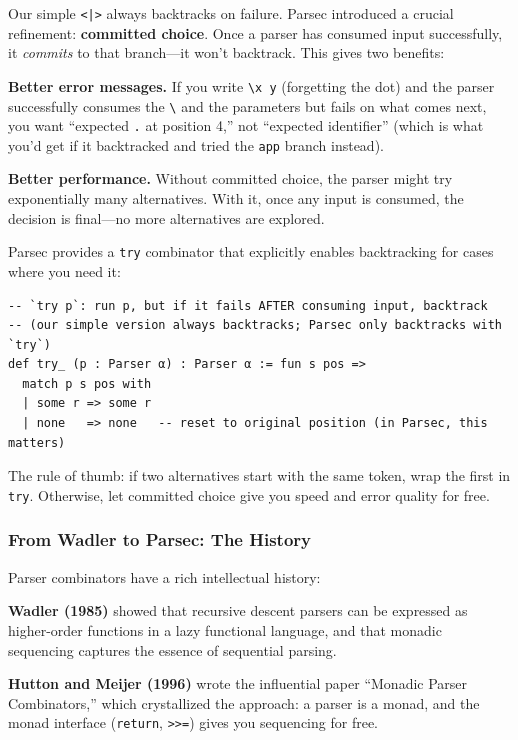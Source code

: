 \documentclass[11pt,a4paper]{article}
\theoremstyle{definition}
\begin{document}
Our simple \texttt{<|>} always backtracks on failure. Parsec introduced a
crucial refinement: \textbf{committed choice}. Once a parser has consumed
input successfully, it \emph{commits} to that branch---it won't backtrack.
This gives two benefits:

\textbf{Better error messages.} If you write \verb|\x y| (forgetting the dot) and the parser
successfully consumes the \verb|\| and the parameters but fails on what comes
next, you want ``expected \texttt{.} at position 4,'' not ``expected
identifier''  (which is what you'd get if it backtracked and tried the
\texttt{app} branch instead).

\textbf{Better performance.} Without committed choice, the parser might try
exponentially many alternatives. With it, once any input is consumed, the
decision is final---no more alternatives are explored.

Parsec provides a \texttt{try} combinator that explicitly enables backtracking
for cases where you need it:

\begin{verbatim}
-- `try p`: run p, but if it fails AFTER consuming input, backtrack
-- (our simple version always backtracks; Parsec only backtracks with `try`)
def try_ (p : Parser α) : Parser α := fun s pos =>
  match p s pos with
  | some r => some r
  | none   => none   -- reset to original position (in Parsec, this matters)
\end{verbatim}

The rule of thumb: if two alternatives start with the same token, wrap the
first in \texttt{try}. Otherwise, let committed choice give you speed and
error quality for free.

\subsubsection{From Wadler to Parsec: The History}

Parser combinators have a rich intellectual history:

\textbf{Wadler (1985)} showed that recursive descent parsers can be expressed
as higher-order functions in a lazy functional language, and that monadic
sequencing captures the essence of sequential parsing.

\textbf{Hutton and Meijer (1996)} wrote the influential paper ``Monadic Parser
Combinators,'' which crystallized the approach: a parser is a monad, and
the monad interface (\texttt{return}, \texttt{>>=}) gives you sequencing
for free.
\end{document}
